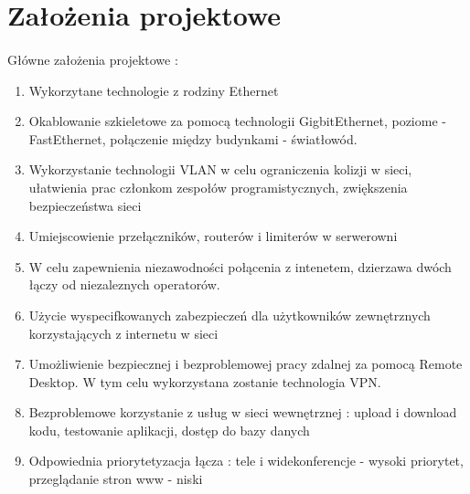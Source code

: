 \section{Założenia projektowe}
\paragraph{}
Główne założenia projektowe :
\begin{enumerate}
	\item Wykorzytane technologie z rodziny Ethernet
	\item Okablowanie szkieletowe za pomocą technologii GigbitEthernet, poziome - FastEthernet, połączenie między budynkami - światłowód.
	\item Wykorzystanie technologii VLAN w celu ograniczenia kolizji  w sieci, ułatwienia prac członkom zespołów programistycznych, zwiększenia bezpieczeństwa sieci
	\item Umiejscowienie przełączników, routerów i limiterów w serwerowni
	\item W celu zapewnienia niezawodności połącenia z intenetem, dzierzawa dwóch łączy od niezaleznych operatorów.
	\item Użycie wyspecifkowanych zabezpieczeń dla użytkowników zewnętrznych korzystających z internetu w sieci
	\item Umożliwienie bezpiecznej i bezproblemowej pracy zdalnej za pomocą Remote Desktop. W tym celu wykorzystana zostanie technologia VPN.
	\item Bezproblemowe korzystanie z usług w sieci wewnętrznej : upload i download kodu, testowanie aplikacji, dostęp do bazy danych
	\item Odpowiednia priorytetyzacja łącza : tele i widekonferencje - wysoki priorytet, przeglądanie stron www - niski
\end{enumerate}